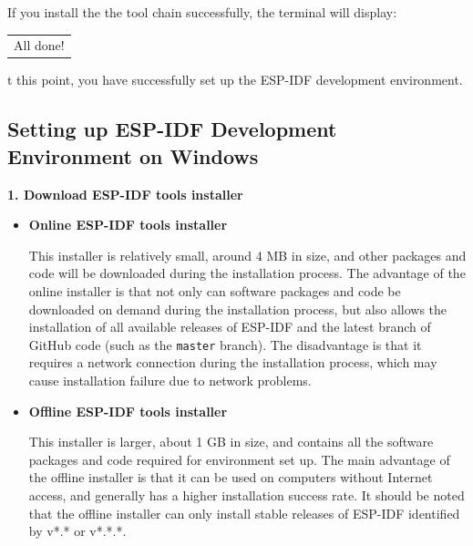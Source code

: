 \documentclass[a4paper,12pt,openany]{book}
\renewcommand{\ttfamily}{\fontfamily{pcr}\selectfont}
\renewcommand{\arraystretch}{1}
\newenvironment{codebloc}{ %
    \ttfamily\footnotesize
    \renewcommand{\arraystretch}{1}
}
\newcommand{\note}[2][NOTE]{ %
\vspace{6pt}
\begin{tabular}{b{\textwidth}}
\hline
\fontfamily{phv}\selectfont \textbf{#1}\\
\leftskip 1em #2\\
\hline
\end{tabular}
}
\begin{document}
If you install the the tool chain successfully, the terminal will display:

\begin{codebloc}
\begin{tabular}{d}
All done!
\end{tabular}
\end{codebloc}

At this point, you have successfully set up the ESP-IDF development environment.

\subsection{Setting up ESP-IDF Development Environment on Windows}
\textbf{1. Download ESP-IDF tools installer}


\begin{itemize}
    \item \textbf{Online ESP-IDF tools installer}
    
    This installer is relatively small, around 4 MB in size, and other packages and code will be downloaded during the installation process. The advantage of the online installer is that not only can software packages and code be downloaded on demand during the installation process, but also allows the installation of all available releases of ESP-IDF and the latest branch of GitHub code (such as the \verb|master| branch). The disadvantage is that it requires a network connection during the installation process, which may cause installation failure due to network problems.
    
    \item \textbf{Offline ESP-IDF tools installer}
    
    This installer is larger, about 1 GB in size, and contains all the software packages and code required for environment set up. The main advantage of the offline installer is that it can be used on computers without Internet access, and generally has a higher installation success rate. It should be noted that the offline installer can only install stable releases of ESP-IDF identified by v*.* or v*.*.*.
\end{itemize}
\end{document}
